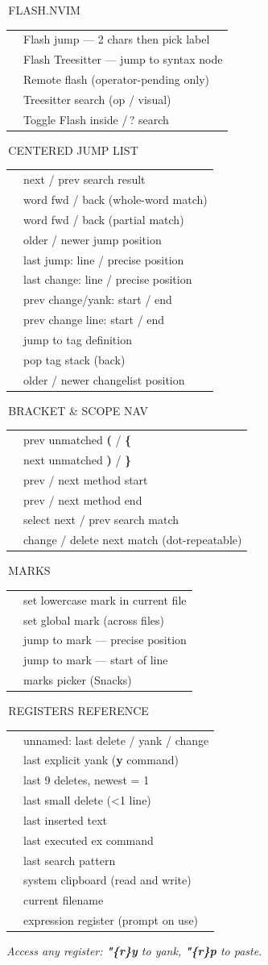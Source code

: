 \documentclass[9pt,a4paper,landscape]{extarticle}
\makeatletter
\newcommand{\kbd}[1]{{\ttfamily\bfseries\footnotesize\color{keyclr}#1}}
\newcommand{\sect}[1]{%
  \vspace{0.5pt}%
  {\setlength{\fboxsep}{1pt}%
   \noindent\colorbox{hdrbg}{\parbox{\dimexpr\columnwidth-2pt\relax}{%
     \color{hdrfg}\bfseries\sffamily\small\strut\,#1}}}%
  \par\vspace{0pt}}
\newlength{\kdsep}\setlength{\kdsep}{0pt}
\newcommand{\kd}[2]{\kbd{#1} & #2 \\[\kdsep]}
\newenvironment{kt}{%
  \setlength{\tabcolsep}{0pt}%
  \begin{tabular}{@{}>{\footnotesize\raggedright\arraybackslash}p{17mm}@{\hspace{2pt}}>{\footnotesize\color{bodyclr}\raggedright\arraybackslash}p{\dimexpr\columnwidth-17mm-2pt\relax}@{}}%
}{%
  \end{tabular}\par}
\newcommand{\snote}[1]{{\scriptsize\color{noteclr}\textit{#1}}\par}
\makeatother
\begin{document}
\begin{multicols}{5}
\sect{FLASH.NVIM}
\begin{kt}
\kd{s}{Flash jump — 2 chars then pick label}
\kd{S}{Flash Treesitter — jump to syntax node}
\kd{r}{Remote flash (operator-pending only)}
\kd{R}{Treesitter search (op / visual)}
\kd{C-s}{Toggle Flash inside /\,? search}
\end{kt}

\sect{CENTERED JUMP LIST}
\begin{kt}
\kd{n\,/\,N}{next / prev search result}
\kd{*\,/\,\#}{word fwd / back (whole-word match)}
\kd{g*\,/\,g\#}{word fwd / back (partial match)}
\kd{C-o\,/\,C-i}{older / newer jump position}
\kd{''\,/\,``}{last jump: line / precise position}
\kd{'.\,/\,`.}{last change: line / precise position}
\kd{`[\,/\,`]}{prev change/yank: start / end}
\kd{['\,/\,]'}{prev change line: start / end}
\kd{C-]}{jump to tag definition}
\kd{C-t}{pop tag stack (back)}
\kd{g;\,/\,g,}{older / newer changelist position}
\end{kt}

\sect{BRACKET \& SCOPE NAV}
\begin{kt}
\kd{[(\,/\,[\{}{prev unmatched \kbd{(} / \kbd{\{}}
\kd{])\,/\,]\}}{next unmatched \kbd{)} / \kbd{\}}}
\kd{[m\,/\,]m}{prev / next method start}
\kd{[M\,/\,]M}{prev / next method end}
\kd{gn\,/\,gN}{select next / prev search match}
\kd{cgn\,/\,dgn}{change / delete next match (dot-repeatable)}
\end{kt}

\sect{MARKS}
\begin{kt}
\kd{m\{a-z\}}{set lowercase mark in current file}
\kd{m\{A-Z\}}{set global mark (across files)}
\kd{`\{a-z\}}{jump to mark — precise position}
\kd{'\{a-z\}}{jump to mark — start of line}
\kd{SPC\,sm}{marks picker (Snacks)}
\end{kt}

\sect{REGISTERS REFERENCE}
\begin{kt}
\kd{""}{unnamed: last delete / yank / change}
\kd{"0}{last explicit yank (\kbd{y} command)}
\kd{"1-"9}{last 9 deletes, newest = 1}
\kd{"-}{last small delete (\textless{}1 line)}
\kd{".}{last inserted text}
\kd{":}{last executed ex command}
\kd{"/}{last search pattern}
\kd{"+}{system clipboard (read and write)}
\kd{"\%}{current filename}
\kd{"=}{expression register (prompt on use)}
\end{kt}
\snote{Access any register: \kbd{"\{r\}y} to yank, \kbd{"\{r\}p} to paste.}


\end{multicols}
\end{document}
